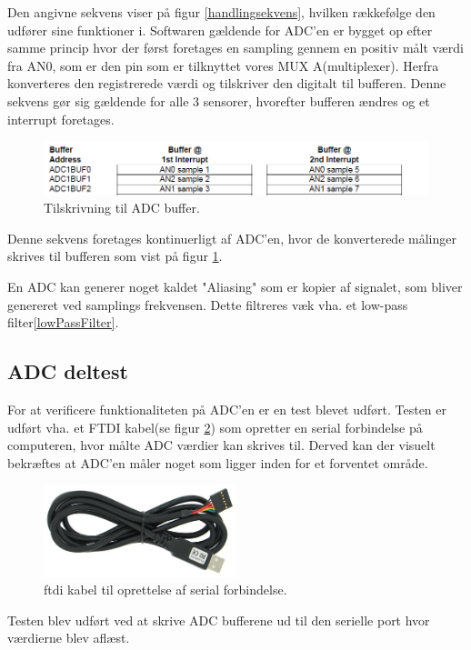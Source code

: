 Den angivne sekvens viser på figur \ref{handlingsekvens}, hvilken rækkefølge den udfører sine funktioner i. Softwaren gældende for ADC'en er bygget op efter samme princip hvor der først foretages en sampling gennem en positiv målt værdi fra AN0, som er den pin som er tilknyttet vores MUX A(multiplexer). Herfra konverteres den registrerede værdi og tilskriver den digitalt til bufferen. Denne sekvens gør sig gældende for alle 3 sensorer, hvorefter bufferen ændres og et interrupt foretages. 

\begin{figure}[h!]
  \centering
  \includegraphics[width=1.1\textwidth]{figures/adcBuffer.png}
  \caption{Tilskrivning til ADC buffer.}
  \label{adcBuffer}
\end{figure}

Denne sekvens foretages kontinuerligt af ADC'en, hvor de konverterede målinger skrives til bufferen som vist på figur \ref{adcBuffer}. 

En ADC kan generer noget kaldet "Aliasing" som er kopier af signalet, som bliver genereret ved samplings frekvensen. Dette filtreres væk vha. et low-pass filter\ref{lowPassFilter}.
\newpage
\subsection{ADC deltest}
For at verificere funktionaliteten på ADC'en er en test blevet udført. Testen er udført vha. et FTDI kabel(se figur \ref{ftdi_cable}) som opretter en serial forbindelse på computeren, hvor målte ADC værdier kan skrives til. Derved kan der visuelt bekræftes at ADC'en måler noget som ligger inden for et forventet område.


\begin{figure}[h!]
  \centering
  \includegraphics[width=0.5\textwidth]{figures/ftdi_cable.png}
  \caption{ftdi kabel til oprettelse af serial forbindelse.}
  \label{ftdi_cable}
\end{figure} 
Testen blev udført ved at skrive ADC bufferene ud til den serielle port hvor værdierne blev aflæst.

